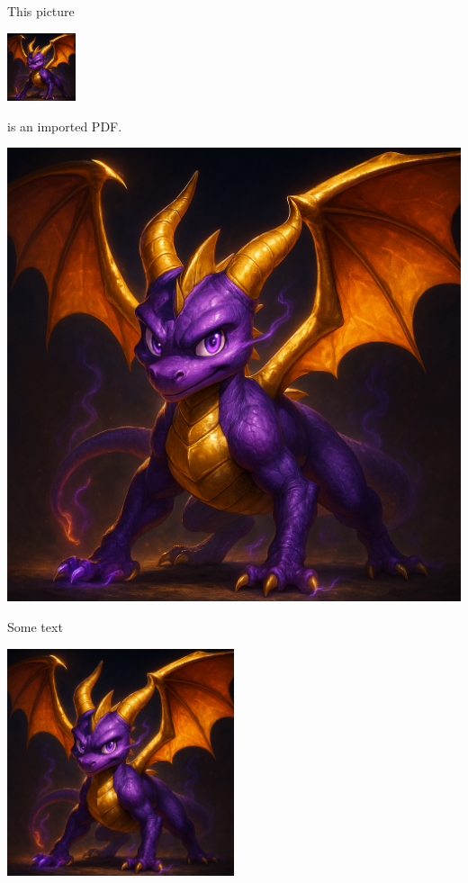 \documentclass{article}
\begin{document}
This picture
\begin{center}
\includegraphics[height=2cm]{example-image.png}
\end{center}
is an imported PDF.




\begin{center}
\includegraphics[height = 0.5\textheight]{example-image.png}
\end{center}
Some text
\begin{center}
\includegraphics[width = 0.5\textwidth]{example-image.png}
\end{center}
\end{document}
